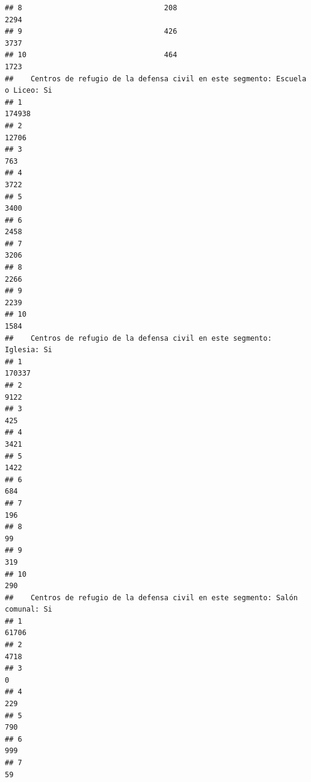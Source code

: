 \documentclass[11pt,]{article}
\begin{document}
\begin{verbatim}
## 8                                 208                              2294
## 9                                 426                              3737
## 10                                464                              1723
##    Centros de refugio de la defensa civil en este segmento: Escuela o Liceo: Si
## 1                                                                        174938
## 2                                                                         12706
## 3                                                                           763
## 4                                                                          3722
## 5                                                                          3400
## 6                                                                          2458
## 7                                                                          3206
## 8                                                                          2266
## 9                                                                          2239
## 10                                                                         1584
##    Centros de refugio de la defensa civil en este segmento: Iglesia: Si
## 1                                                                170337
## 2                                                                  9122
## 3                                                                   425
## 4                                                                  3421
## 5                                                                  1422
## 6                                                                   684
## 7                                                                   196
## 8                                                                    99
## 9                                                                   319
## 10                                                                  290
##    Centros de refugio de la defensa civil en este segmento: Salón comunal: Si
## 1                                                                       61706
## 2                                                                        4718
## 3                                                                           0
## 4                                                                         229
## 5                                                                         790
## 6                                                                         999
## 7                                                                          59

\end{verbatim}
\end{document}
